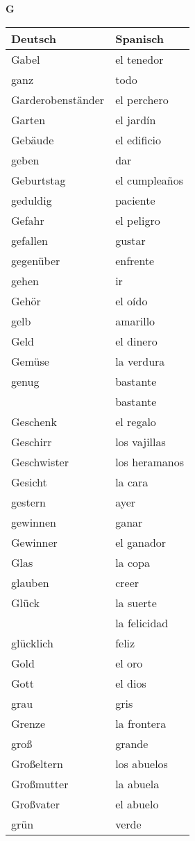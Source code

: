 \begin{flushright}\begin{Huge}\textbf{G}\end{Huge}\end{flushright}

\begin{longtable}{p{} p{}} 
\textbf{Deutsch}     & \textbf{Spanisch}                                       \\ \hline
\hline
\endhead %
Gabel & el tenedor\\
ganz & todo\\
Garderobenständer & el perchero\\
Garten & el jardín\\
Gebäude & el edificio\\
geben & dar\\
Geburtstag & el cumpleaños\\
geduldig & paciente\\
Gefahr & el peligro\\
gefallen & gustar\\
gegenüber & enfrente\\
gehen & ir\\
Gehör & el oído\\
gelb & amarillo \\
Geld & el dinero\\
Gemüse & la verdura\\
genug & bastante\\
~ & bastante\\
Geschenk & el regalo\\
Geschirr & los vajillas\\
Geschwister & los heramanos \\
Gesicht & la cara\\
gestern & ayer\\
gewinnen & ganar\\
Gewinner & el ganador\\
Glas & la copa\\
glauben & creer\\
Glück & la suerte \\
~ & la felicidad \\
glücklich & feliz\\
Gold & el oro\\
Gott & el dios\\
grau & gris \\
Grenze & la frontera\\
groß & grande\\
Großeltern & los abuelos\\
Großmutter & la abuela\\
Großvater & el abuelo\\
grün & verde\\

\end{longtable}
